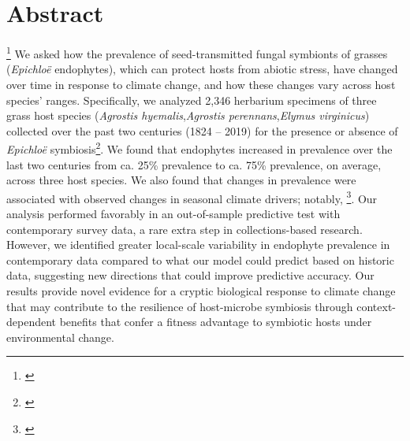 \documentclass[11pt]{article}
\newcommand{\tom}[2]{{\color{red}{#1}}\footnote{\textit{\color{red}{#2}}}}
\begin{document}
	\section*{Abstract}
\tom{Species' distributions and abundances are shifting in response to climate change. 
Most species harbor microbial symbionts that have the potential to influence these responses.
Mutualistic microbial symbionts may provide resilience to environmental change by protecting their hosts from increasing stress. 
However, environmental change that disrupts these interactions may lead to declines in hosts and/or symbionts. 
Symbionts preserved within herbarium specimens offer a unique opportunity to quantify changes in microbial symbiosis across broad temporal and spatial scales. }{If you need to cut words, I think some of this could be condensed.}
We asked how the prevalence of seed-transmitted fungal symbionts of grasses (\emph{Epichloë} endophytes), which can protect hosts from abiotic stress, have changed over time in response to climate change, and how these changes vary across host species' ranges.
Specifically, we analyzed 2,346 herbarium specimens of three grass host species (\emph{Agrostis hyemalis},\emph{Agrostis perennans},\emph{Elymus virginicus}) collected over the past two centuries (1824 -- 2019) for the presence or absence of \emph{Epichloë} symbiosis\tom{, and evaluated spatial and temporal trends in endophyte prevalence}{Could cut, overlaps with previous sentence.}. 
We found that endophytes increased in prevalence over the last two centuries from ca. 25\% prevalence to ca. 75\% prevalence, on average, across three host species.
We also found that changes in prevalence were associated with observed changes in seasonal climate drivers; notably, \tom{increasing precipitation corresponding to each host species' peak growing season and changes in off-peak season variability in precipitation}{I would rephrase this to better communicate the sign of the association, and thus the inferred causality.}. 
Our analysis performed favorably in an out-of-sample predictive test with contemporary survey data, a rare extra step in collections-based research.
However, we identified greater local-scale variability in endophyte prevalence in contemporary data compared to what our model could predict based on historic data, suggesting new directions that could improve predictive accuracy.
Our results provide novel evidence for a cryptic biological response to climate change that may contribute to the resilience of host-microbe symbiosis through context-dependent benefits that confer a fitness advantage to symbiotic hosts under environmental change. 
\end{document}
